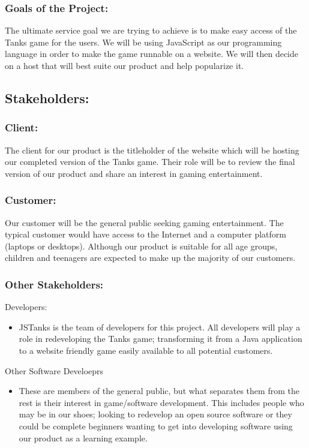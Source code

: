 \documentclass{article}
\begin{document}
\subsubsection{Goals of the Project:} The ultimate service goal we are trying to
achieve is to make easy access of the Tanks game for the users. We will be using
JavaScript as our programming language in order to make the game runnable on a
website. We will then decide on a host that will best suite our product and help
popularize it.

\subsection{Stakeholders:} 
\subsubsection{Client:} 
The client for our product is
the titleholder of the website which will be hosting our completed version of
the Tanks game. Their role will be to review the final version of our product
and share an interest in gaming entertainment.

\subsubsection{Customer:} Our customer will be the general public seeking gaming
entertainment. The typical customer would have access to the Internet and a
computer platform (laptops or desktops). Although our product is suitable for
all age groups, children and teenagers are expected to make up the majority of
our customers.

\subsubsection{Other Stakeholders:} 
Developers: 
\begin{itemize} 
\item JSTanks is
the team of developers for this project. All developers will play a role in
redeveloping the Tanks game; transforming it from a Java application to a
website friendly game easily available to all potential customers.
\end{itemize} Other Software Develoeprs 
\begin{itemize} 
\item  These are members
of the general public, but what separates them from the rest is their interest
in game/software development. This includes people who may be in our shoes;
looking to redevelop an open source software or they could be complete beginners
wanting to get into developing software using our product as a learning example.
\end{itemize}
\end{document}
